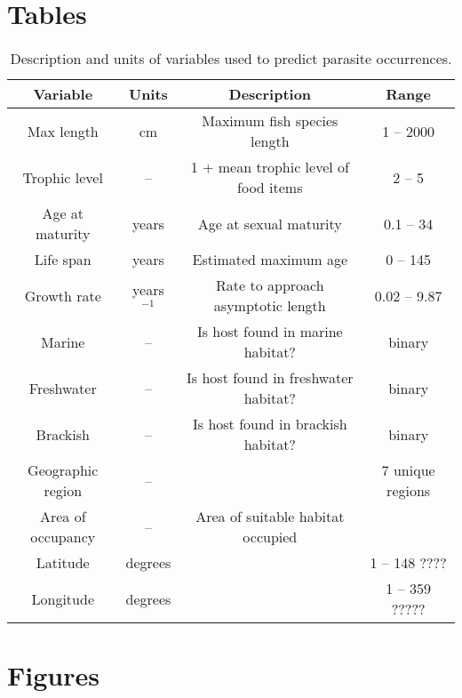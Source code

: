 \documentclass[12pt]{article}
\begin{document}
\section*{Tables}
  \begin{table}[!h]
  \caption{Description and units of variables used to predict parasite occurrences.}
  \begin{tabular}{cccc}
\hline
  \textbf{Variable} &   \textbf{Units} &   \textbf{Description} &   \textbf{Range} \\ 
\hline
Max length      & cm           & Maximum fish species length  & 1 -- 2000 \\ 
Trophic level   & --           & 1 + mean trophic level of food items   &  2 -- 5\\ 
Age at maturity & years        & Age at sexual maturity  & 0.1 -- 34  \\ 
Life span       & years        & Estimated maximum age & 0 -- 145  \\ 
Growth rate     & years$^{-1}$ & Rate to approach asymptotic length & 0.02 -- 9.87 \\ 
Marine          & --           & Is host found in marine habitat? & binary  \\ 
Freshwater      & --           & Is host found in freshwater habitat? & binary \\ 
Brackish        & --           & Is host found in brackish habitat? & binary \\ 
\hline 
Geographic region   & --      &           & 7 unique regions \\ 
Area of occupancy   & -- & Area of suitable habitat occupied &  \\
Latitude            & degrees &         & 1 -- 148 ???? \\ 
Longitude           & degrees &         & 1 -- 359 ????? \\ 
\hline
  \end{tabular}
  \label{tab:traits}
\end{table}


   
   
   

\newpage
\section{Figures}

\begin{figure}[h!]
  \caption{ }
 \label{fig:a}
 \end{figure}


 \begin{figure}[h!]
  \caption{ }
 \label{fig:b}
 \end{figure}

 \begin{figure}[h!]
  \caption{
 }
 \label{fig:c}
 \end{figure}
\end{document}
